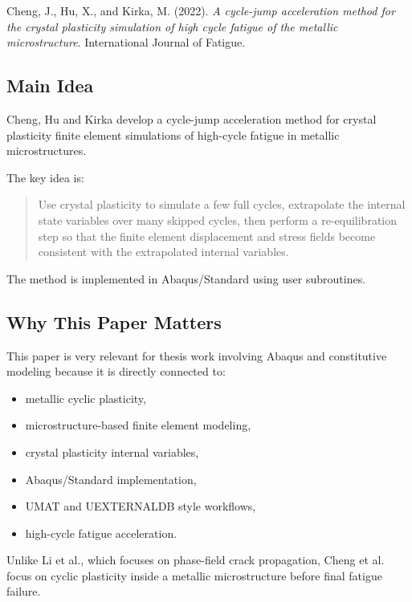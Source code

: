 \documentclass[11pt,a4paper]{article}
\begin{document}
Cheng, J., Hu, X., and Kirka, M. (2022). \textit{A cycle-jump acceleration method for the crystal plasticity simulation of high cycle fatigue of the metallic microstructure}. International Journal of Fatigue.

\subsection{Main Idea}

Cheng, Hu and Kirka develop a cycle-jump acceleration method for crystal plasticity finite element simulations of high-cycle fatigue in metallic microstructures.

The key idea is:

\begin{quote}
Use crystal plasticity to simulate a few full cycles, extrapolate the internal state variables over many skipped cycles, then perform a re-equilibration step so that the finite element displacement and stress fields become consistent with the extrapolated internal variables.
\end{quote}

The method is implemented in Abaqus/Standard using user subroutines.

\subsection{Why This Paper Matters}

This paper is very relevant for thesis work involving Abaqus and constitutive modeling because it is directly connected to:

\begin{itemize}
    \item metallic cyclic plasticity,
    \item microstructure-based finite element modeling,
    \item crystal plasticity internal variables,
    \item Abaqus/Standard implementation,
    \item UMAT and UEXTERNALDB style workflows,
    \item high-cycle fatigue acceleration.
\end{itemize}

Unlike Li et al., which focuses on phase-field crack propagation, Cheng et al. focus on cyclic plasticity inside a metallic microstructure before final fatigue failure.
\end{document}
